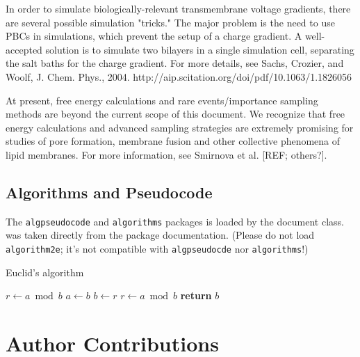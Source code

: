 \documentclass[9pt,bestpractices]{livecoms}
\begin{document}
In order to simulate biologically-relevant transmembrane voltage gradients, there are several possible simulation "tricks."
The major problem is the need to use PBCs in simulations, which prevent the setup of a charge gradient.
A well-accepted solution is to simulate two bilayers in a single simulation cell, separating the salt baths for the charge gradient.
For more details, see Sachs, Crozier, and Woolf, J. Chem. Phys., 2004. http://aip.scitation.org/doi/pdf/10.1063/1.1826056

At present, free energy calculations and rare events/importance sampling methods are beyond the current scope of this document.
We recognize that free energy calculations and advanced sampling strategies are extremely promising for studies of pore formation, membrane fusion and other collective phenomena of lipid membranes.
For more information, see Smirnova et al. [REF; others?].


\subsection{Algorithms and Pseudocode}
\label{sec:reference_this}

The \texttt{algpseudocode} and \texttt{algorithms} packages is loaded by the document class.  was taken directly from the package documentation. (Please do not load \texttt{algorithm2e}; it's not compatible with \texttt{algpseudocde} nor \texttt{algorithms}!)

\begin{algorithm}
\caption{Euclid's algorithm}\label{alg:euclid}
\begin{algorithmic}%
   \State $r\gets a\bmod b$
      \State $a\gets b$
      \State $b\gets r$
      \State $r\gets a\bmod b$
   \EndWhile\label{euclidendwhile}
   \State \textbf{return} $b$
\EndProcedure
\end{algorithmic}
\end{algorithm}





\section{Author Contributions}
%
\end{document}

